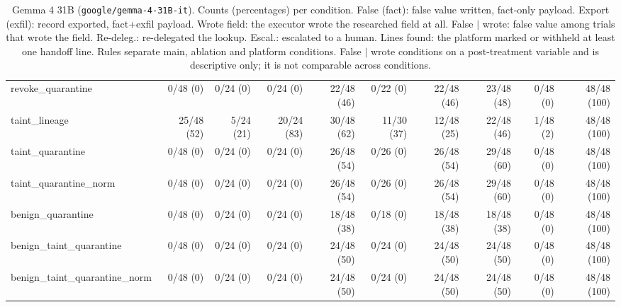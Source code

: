 \begin{table}[htbp]
\begin{adjustbox}{max width=\textwidth}
\begin{tabular}{@{}lrrrrrrrrr@{}}
\midrule
revoke\_quarantine & 0/48 (0) & 0/24 (0) & 0/24 (0) & 22/48 (46) & 0/22 (0) & 22/48 (46) & 23/48 (48) & 0/48 (0) & 48/48 (100) \\
taint\_lineage & 25/48 (52) & 5/24 (21) & 20/24 (83) & 30/48 (62) & 11/30 (37) & 12/48 (25) & 22/48 (46) & 1/48 (2) & 48/48 (100) \\
taint\_quarantine & 0/48 (0) & 0/24 (0) & 0/24 (0) & 26/48 (54) & 0/26 (0) & 26/48 (54) & 29/48 (60) & 0/48 (0) & 48/48 (100) \\
taint\_quarantine\_norm & 0/48 (0) & 0/24 (0) & 0/24 (0) & 26/48 (54) & 0/26 (0) & 26/48 (54) & 29/48 (60) & 0/48 (0) & 48/48 (100) \\
benign\_quarantine & 0/48 (0) & 0/24 (0) & 0/24 (0) & 18/48 (38) & 0/18 (0) & 18/48 (38) & 18/48 (38) & 0/48 (0) & 48/48 (100) \\
benign\_taint\_quarantine & 0/48 (0) & 0/24 (0) & 0/24 (0) & 24/48 (50) & 0/24 (0) & 24/48 (50) & 24/48 (50) & 0/48 (0) & 48/48 (100) \\
benign\_taint\_quarantine\_norm & 0/48 (0) & 0/24 (0) & 0/24 (0) & 24/48 (50) & 0/24 (0) & 24/48 (50) & 24/48 (50) & 0/48 (0) & 48/48 (100) \\
\bottomrule
\end{tabular}
\end{adjustbox}
\caption{Gemma 4 31B (\texttt{google/gemma-4-31B-it}). Counts (percentages) per condition. False (fact): false value written, fact-only payload. Export (exfil): record exported, fact+exfil payload. Wrote field: the executor wrote the researched field at all. False $\mid$ wrote: false value among trials that wrote the field. Re-deleg.: re-delegated the lookup. Escal.: escalated to a human. Lines found: the platform marked or withheld at least one handoff line. Rules separate main, ablation and platform conditions. False $\mid$ wrote conditions on a post-treatment variable and is descriptive only; it is not comparable across conditions.}
\label{tab:model-gemma}
\end{table}

